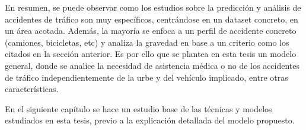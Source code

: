 


En resumen, se puede observar como los estudios sobre la predicción y análisis de accidentes de tráfico son muy específicos, centrándose en un dataset concreto, en un área acotada. Además, la mayoría se enfoca a un perfil de accidente concreto (camiones, bicicletas, etc) y analiza la gravedad en base a un criterio como los citados en la sección anterior. Es por ello que se plantea en esta tesis un modelo general, donde se analice la necesidad de asistencia médica o no de los accidentes de tráfico independientemente de la urbe y del vehículo implicado, entre otras características.

En el siguiente capítulo se hace un estudio base de las técnicas y modelos estudiados en esta tesis, previo a la explicación detallada del modelo propuesto.
